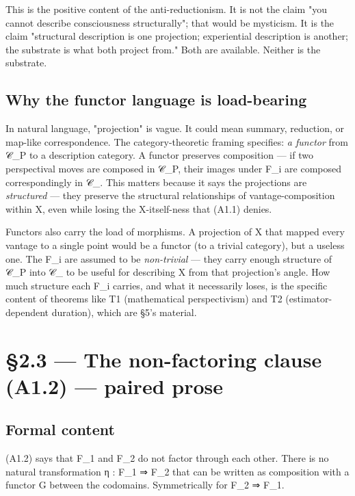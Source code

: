 \documentclass[11pt, openany]{book}
\newcommand{\sectionbreak}{\clearpage}
\begin{document}
This is the positive content of the anti-reductionism. It is not the claim "you cannot describe consciousness structurally"; that would be mysticism. It is the claim "structural description is one projection; experiential description is another; the substrate is what both project from." Both are available. Neither is the substrate.

\subsection{Why the functor language is load-bearing}

In natural language, "projection" is vague. It could mean summary, reduction, or map-like correspondence. The category-theoretic framing specifies: \textit{a functor} from 𝒞\_\allowbreak{}P to a description category. A functor preserves composition --- if two perspectival moves are composed in 𝒞\_\allowbreak{}P, their images under F\_\allowbreak{}i are composed correspondingly in 𝒞\_. This matters because it says the projections are \textit{structured} --- they preserve the structural relationships of vantage-composition within X, even while losing the X-itself-ness that (A1.1) denies.

Functors also carry the load of morphisms. A projection of X that mapped every vantage to a single point would be a functor (to a trivial category), but a useless one. The F\_\allowbreak{}i are assumed to be \textit{non-trivial} --- they carry enough structure of 𝒞\_\allowbreak{}P into 𝒞\_ to be useful for describing X from that projection's angle. How much structure each F\_\allowbreak{}i carries, and what it necessarily loses, is the specific content of theorems like T1 (mathematical perspectivism) and T2 (estimator-dependent duration), which are §5's material.

\sectionbreak

\section{§2.3 --- The non-factoring clause (A1.2) --- paired prose}

\subsection{Formal content}

(A1.2) says that F\_\allowbreak{}1 and F\_\allowbreak{}2 do not factor through each other. There is no natural transformation η : F\_\allowbreak{}1 ⇒ F\_\allowbreak{}2 that can be written as composition with a functor G between the codomains. Symmetrically for F\_\allowbreak{}2 ⇒ F\_\allowbreak{}1.
\end{document}
